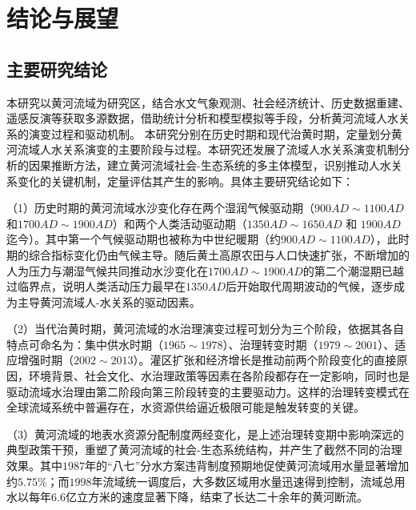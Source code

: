 \chapter{结论与展望}

\section{主要研究结论}

本研究以黄河流域为研究区，结合水文气象观测、社会经济统计、历史数据重建、遥感反演等获取多源数据，借助统计分析和模型模拟等手段，分析黄河流域人水关系的演变过程和驱动机制。
本研究分别在历史时期和现代治黄时期，定量划分黄河流域人水关系演变的主要阶段与过程。本研究还发展了流域人水关系演变机制分析的因果推断方法，建立黄河流域社会-生态系统的多主体模型，识别推动人水关系变化的关键机制，定量评估其产生的影响。具体主要研究结论如下：

（1）历史时期的黄河流域水沙变化存在两个湿润气候驱动期（$900AD\sim1100AD$和$1700AD\sim1900AD$）和两个人类活动驱动期（$1350AD \sim 1650AD$ 和 $1900AD$迄今）。其中第一个气候驱动期也被称为中世纪暖期（约$900AD \sim 1100AD$），此时期的综合指标变化仍由气候主导。随后黄土高原农田与人口快速扩张，不断增加的人为压力与潮湿气候共同推动水沙变化在$1700AD \sim 1900AD$的第二个潮湿期已越过临界点，说明人类活动压力最早在$1350AD$后开始取代周期波动的气候，逐步成为主导黄河流域人-水关系的驱动因素。

（2）当代治黄时期，黄河流域的水治理演变过程可划分为三个阶段，依据其各自特点可命名为：集中供水时期（$1965 \sim 1978$）、治理转变时期（$1979 \sim 2001$）、适应增强时期（$2002 \sim 2013$）。灌区扩张和经济增长是推动前两个阶段变化的直接原因，环境背景、社会文化、水治理政策等因素在各阶段都存在一定影响，同时也是驱动流域水治理由第二阶段向第三阶段转变的主要驱动力。这样的治理转变模式在全球流域系统中普遍存在，水资源供给逼近极限可能是触发转变的关键。

（3）黄河流域的地表水资源分配制度两经变化，是上述治理转变期中影响深远的典型政策干预，重塑了黄河流域的社会-生态系统结构，并产生了截然不同的治理效果。其中$1987$年的“八七”分水方案违背制度预期地促使黄河流域用水量显著增加约$5.75\%$；而$1998$年流域统一调度后，大多数区域用水量迅速得到控制，流域总用水以每年$6.6$亿立方米的速度显著下降，结束了长达二十余年的黄河断流。

